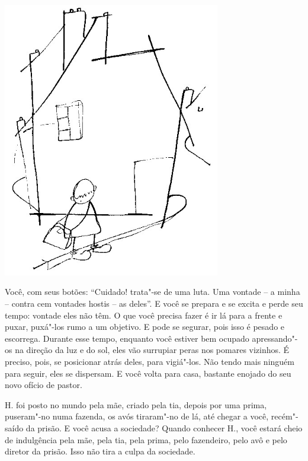 \begin{vplace}[.50]
\begin{center}
\includegraphics[width=95mm]{./imgs/Image_3.jpg}
\end{center}
\end{vplace}

\pagebreak

Você, com seus botões: ``Cuidado! trata"-se de uma luta. Uma vontade -- a
minha -- contra cem vontades hostis -- as deles''. E você se prepara e
se excita e perde seu tempo: vontade eles não têm. O que você precisa
fazer é ir lá para a frente e puxar, puxá"-los rumo a um objetivo. E pode
se segurar, pois isso é pesado e escorrega. Durante esse tempo, enquanto
você estiver bem ocupado apressando"-os na direção da luz e do sol, eles
vão surrupiar peras nos pomares vizinhos. É preciso, pois, se posicionar
atrás deles, para vigiá"-los. Não tendo mais ninguém para seguir, eles se
dispersam. E você volta para casa, bastante enojado do seu novo ofício
de pastor.

\bigskip
\bigskip


H. foi posto no mundo pela mãe, criado pela tia, depois por uma prima,
puseram"-no numa fazenda, os avós tiraram"-no de lá, até chegar a você,
recém"-saído da prisão. E você acusa a sociedade? Quando conhecer H.,
você estará cheio de indulgência pela mãe, pela tia, pela prima, pelo
fazendeiro, pelo avô e pelo diretor da prisão. Isso não tira a culpa da
sociedade.

